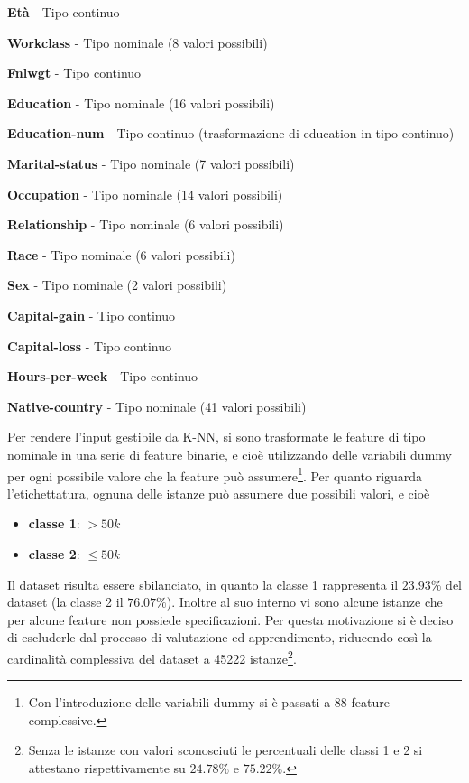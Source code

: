 \documentclass[fleqn,10pt]{SelfArx} %
\begin{document}
\begin{itemize}
\footnotesize{
\item \textbf{Età} - Tipo continuo
\item \textbf{Workclass} - Tipo nominale (8 valori possibili)
\item \textbf{Fnlwgt} - Tipo continuo
\item \textbf{Education} - Tipo nominale (16 valori possibili)
\item \textbf{Education-num} - Tipo continuo (trasformazione di education in tipo continuo)
\item \textbf{Marital-status} - Tipo nominale (7 valori possibili)
\item \textbf{Occupation} - Tipo nominale (14 valori possibili)
\item \textbf{Relationship} - Tipo nominale (6 valori possibili)
\item \textbf{Race} - Tipo nominale (6 valori possibili)
\item \textbf{Sex} - Tipo nominale (2 valori possibili)
\item \textbf{Capital-gain} - Tipo continuo 
\item \textbf{Capital-loss} - Tipo continuo
\item \textbf{Hours-per-week} - Tipo continuo
\item \textbf{Native-country} - Tipo nominale (41 valori possibili)}
\end{itemize}
Per rendere l'input gestibile da K-NN, si sono trasformate le feature di tipo nominale in una serie di feature binarie, e cioè utilizzando delle variabili dummy per ogni possibile valore che la feature può assumere\footnote{\footnotesize{Con l'introduzione delle variabili dummy si è passati a 88 feature complessive.}}.
\newline
Per quanto riguarda l'etichettatura, ognuna delle istanze può assumere due possibili valori, e cioè
\begin{itemize}
\item \textbf{classe 1}: $>50k$ 
\item \textbf{classe 2}: $\le50k$
\end{itemize} 

Il dataset risulta essere sbilanciato, in quanto la classe 1 rappresenta il $23.93\% $ del dataset (la classe 2 il $76.07\% $). Inoltre al suo interno vi sono alcune istanze che per alcune feature non possiede specificazioni. Per questa motivazione si è deciso di escluderle dal processo di valutazione ed apprendimento, riducendo così la cardinalità complessiva del dataset a 45222 istanze\footnote{\footnotesize{Senza le istanze con valori sconosciuti le percentuali delle classi 1 e 2 si attestano rispettivamente su $24.78\%$ e $75.22\%$.}}. 
\end{document}
